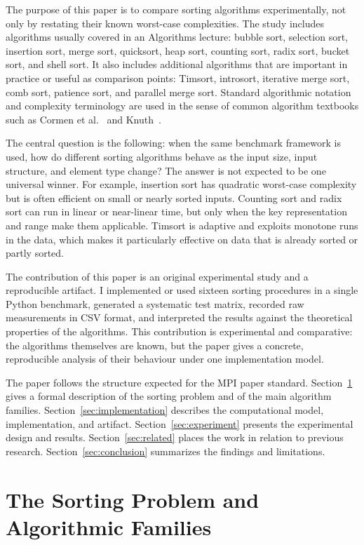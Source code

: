 \documentclass[11pt,a4paper]{article}
\begin{document}
The purpose of this paper is to compare sorting algorithms experimentally, not only by restating their known worst-case complexities. The study includes algorithms usually covered in an Algorithms lecture: bubble sort, selection sort, insertion sort, merge sort, quicksort, heap sort, counting sort, radix sort, bucket sort, and shell sort. It also includes additional algorithms that are important in practice or useful as comparison points: Timsort, introsort, iterative merge sort, comb sort, patience sort, and parallel merge sort. Standard algorithmic notation and complexity terminology are used in the sense of common algorithm textbooks such as Cormen et al.~\cite{cormen2009} and Knuth~\cite{knuth1998}.

The central question is the following: when the same benchmark framework is used, how do different sorting algorithms behave as the input size, input structure, and element type change? The answer is not expected to be one universal winner. For example, insertion sort has quadratic worst-case complexity but is often efficient on small or nearly sorted inputs. Counting sort and radix sort can run in linear or near-linear time, but only when the key representation and range make them applicable. Timsort is adaptive and exploits monotone runs in the data, which makes it particularly effective on data that is already sorted or partly sorted.

The contribution of this paper is an original experimental study and a reproducible artifact. I implemented or used sixteen sorting procedures in a single Python benchmark, generated a systematic test matrix, recorded raw measurements in CSV format, and interpreted the results against the theoretical properties of the algorithms. This contribution is experimental and comparative: the algorithms themselves are known, but the paper gives a concrete, reproducible analysis of their behaviour under one implementation model.

The paper follows the structure expected for the MPI paper standard. Section~\ref{sec:formal} gives a formal description of the sorting problem and of the main algorithm families. Section~\ref{sec:implementation} describes the computational model, implementation, and artifact. Section~\ref{sec:experiment} presents the experimental design and results. Section~\ref{sec:related} places the work in relation to previous research. Section~\ref{sec:conclusion} summarizes the findings and limitations.

\section{The Sorting Problem and Algorithmic Families}\label{sec:formal}
\end{document}
